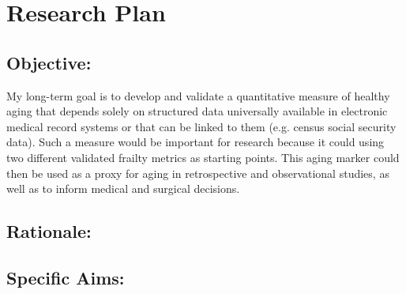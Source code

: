 \section{Research Plan }\label{research-plan}


\subsection{Objective:}\label{objective}
  
My long-term goal is to develop and validate a quantitative measure of healthy aging that depends solely on structured data universally available in electronic medical record systems or that can be linked to them (e.g. census social security data). Such a measure would be important for research because it could 
using two different validated frailty metrics as starting points. This
aging marker could then be used as a proxy for aging in retrospective
and observational studies, as well as to inform medical and surgical
decisions.


\subsection{Rationale:}\label{rationale}

\subsection{Specific Aims:}\label{specific-aims}
